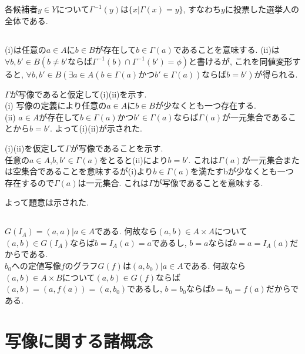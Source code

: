 \documentclass{jsarticle}
\begin{document}
\subsection{} %
各候補者$y \in Y$について$\Gamma^{-1}(y)$は$\{x | \Gamma(x) = y\}$, すなわち$y$に投票した選挙人の全体である.

\subsection{} %
(i)は任意の$a \in A$に$b \in B$が存在して$b \in \Gamma(a)$であることを意味する.
(ii)は$\forall{b, b' \in B}(b \neq b' ならば \Gamma^{-1}(b) \cap \Gamma^{-1}(b') = \phi)$と書けるが, これを同値変形すると, $\forall{b, b' \in B}(\exists{a \in A}(b \in \Gamma(a) かつ b' \in \Gamma(a)) ならば b = b')$が得られる. 

$\Gamma$が写像であると仮定して(i)(ii)を示す.\\
(i) 写像の定義により任意の$a \in A$に$b \in B$が少なくとも一つ存在する.\\
(ii) $a \in A$が存在して$b \in \Gamma(a) かつ b' \in \Gamma(a)$ならば$\Gamma(a)$が一元集合であることから$b = b'$.
よって(i)(ii)が示された.

(i)(ii)を仮定して$\Gamma$が写像であることを示す.\\
任意の$a \in A$,$b, b' \in \Gamma(a)$をとると(ii)により$b = b'$. これは$\Gamma(a)$が一元集合または空集合であることを意味するが(i)より$b \in \Gamma(a)$を満たすbが少なくとも一つ存在するので$\Gamma(a)$は一元集合. これは$\Gamma$が写像であることを意味する.

よって題意は示された.

\subsection{} %
$G(I_A) = {(a, a)| a \in A}$である. 何故なら$(a, b) \in A \times A$について$(a, b) \in G(I_A)$ならば$b = I_A(a) = a$であるし, $b = a$ならば$b = a = I_A(a)$だからである.\\
$b_0$への定値写像$f$のグラフ$G(f)$は${(a, b_0) | a \in A}$である. 何故なら$(a, b) \in A \times B$について$(a, b) \in G(f)$ならば$(a, b) = (a, f(a)) = (a, b_0)$であるし, $b = b_0$ならば$b = b_0 = f(a)$だからである.

\section{写像に関する諸概念} %
\end{document}
